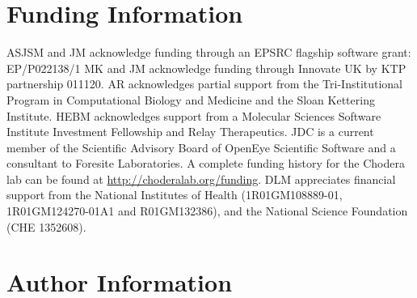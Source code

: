 \documentclass[9pt,bestpractices]{livecoms}
\begin{document}
\section*{Funding Information}
ASJSM and JM acknowledge funding through an EPSRC flagship software grant: EP/P022138/1
MK and JM acknowledge funding through Innovate UK by KTP partnership 011120.
AR acknowledges partial support from the Tri-Institutional Program in Computational Biology and Medicine and the Sloan Kettering Institute.
HEBM acknowledges support from a Molecular Sciences Software Institute Investment Fellowship and Relay Therapeutics.
JDC is a current member of the Scientific Advisory Board of OpenEye Scientific Software and a consultant to Foresite Laboratories. A complete funding history for the Chodera lab can be found at \url{http://choderalab.org/funding}. DLM appreciates financial support from the National Institutes of Health (1R01GM108889-01, 1R01GM124270-01A1 and R01GM132386), and the National Science Foundation (CHE 1352608).

\section*{Author Information}
\makeorcid



\end{document}
